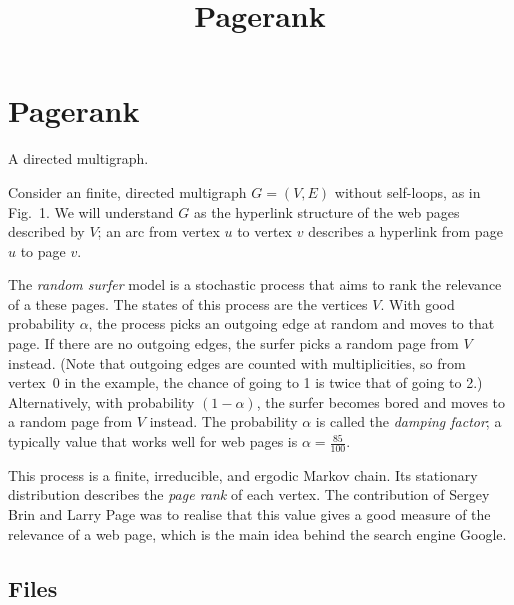 \documentclass{tufte-handout}
\title{\sf Pagerank}
\begin{document}
\maketitle
{}

\section{Pagerank}

\begin{marginfigure}
\caption{A directed multigraph.}
\end{marginfigure}
Consider an finite, directed multigraph $G=(V,E)$ without self-loops, as in
Fig.~1.
We will understand $G$ as the hyperlink structure of the web pages
described by $V$; an arc from vertex $u$ to vertex $v$ describes a
hyperlink from page $u$ to page $v$.

The \emph{random surfer} model is a stochastic process that aims to
rank the relevance of a these pages.
The states of this process are the vertices $V$.
With good probability $\alpha$, the process picks an outgoing edge at
random and moves to that page.
If there are no outgoing edges, the surfer picks a random page from
$V$ instead.
(Note that outgoing edges are counted with multiplicities, so from
vertex~0 in the example, the chance of going to 1 is twice that of
going to 2.)
Alternatively, with probability $(1-\alpha)$, the surfer becomes bored
and moves to a random page from $V$ instead.
The probability $\alpha$ is called the \emph{damping factor}; a
typically value that works well for web pages is $\alpha = \frac{85}{100}$. 

This process is a finite, irreducible, and ergodic Markov chain.
Its stationary distribution describes the \emph{page rank} of each
vertex. The contribution of Sergey Brin and Larry Page was to
realise that this value gives a good measure of the relevance of a web
page, which is the main idea behind the search engine
Google.

\subsection{Files}
\end{document}
